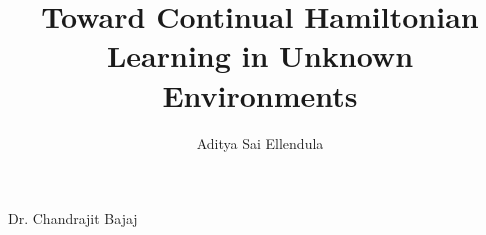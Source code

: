 \author{Aditya Sai Ellendula}  	%

\address{adityase@utexas.edu}  %

\title{Toward Continual Hamiltonian Learning in Unknown Environments} %


%
%
%
	\supervisor
		{Dr. Chandrajit Bajaj}
%
%
%

%
%
%
%
%
%


